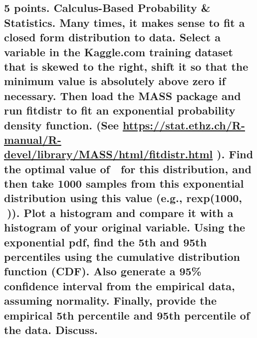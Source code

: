 \documentclass[]{article}
\begin{document}
\subsection{\texorpdfstring{5 points. Calculus-Based Probability \&
Statistics. Many times, it makes sense to fit a closed form distribution
to data. Select a variable in the Kaggle.com training dataset that is
skewed to the right, shift it so that the minimum value is absolutely
above zero if necessary. Then load the MASS package and run fitdistr to
fit an exponential probability density function. (See
\url{https://stat.ethz.ch/R-manual/R-devel/library/MASS/html/fitdistr.html}
). Find the optimal value of  for this distribution, and then take 1000
samples from this exponential distribution using this value (e.g.,
rexp(1000, )). Plot a histogram and compare it with a histogram of your
original variable. Using the exponential pdf, find the 5th and 95th
percentiles using the cumulative distribution function (CDF). Also
generate a 95\% confidence interval from the empirical data, assuming
normality. Finally, provide the empirical 5th percentile and 95th
percentile of the data.
Discuss.}{5 points. Calculus-Based Probability \& Statistics. Many times, it makes sense to fit a closed form distribution to data. Select a variable in the Kaggle.com training dataset that is skewed to the right, shift it so that the minimum value is absolutely above zero if necessary. Then load the MASS package and run fitdistr to fit an exponential probability density function. (See https://stat.ethz.ch/R-manual/R-devel/library/MASS/html/fitdistr.html ). Find the optimal value of  for this distribution, and then take 1000 samples from this exponential distribution using this value (e.g., rexp(1000, )). Plot a histogram and compare it with a histogram of your original variable. Using the exponential pdf, find the 5th and 95th percentiles using the cumulative distribution function (CDF). Also generate a 95\% confidence interval from the empirical data, assuming normality. Finally, provide the empirical 5th percentile and 95th percentile of the data. Discuss.}}\label{points.-calculus-based-probability-statistics.-many-times-it-makes-sense-to-fit-a-closed-form-distribution-to-data.-select-a-variable-in-the-kaggle.com-training-dataset-that-is-skewed-to-the-right-shift-it-so-that-the-minimum-value-is-absolutely-above-zero-if-necessary.-then-load-the-mass-package-and-run-fitdistr-to-fit-an-exponential-probability-density-function.-see-httpsstat.ethz.chr-manualr-devellibrarymasshtmlfitdistr.html-.-find-the-optimal-value-of-for-this-distribution-and-then-take-1000-samples-from-this-exponential-distribution-using-this-value-e.g.-rexp1000-.-plot-a-histogram-and-compare-it-with-a-histogram-of-your-original-variable.-using-the-exponential-pdf-find-the-5th-and-95th-percentiles-using-the-cumulative-distribution-function-cdf.-also-generate-a-95-confidence-interval-from-the-empirical-data-assuming-normality.-finally-provide-the-empirical-5th-percentile-and-95th-percentile-of-the-data.-discuss.}
\end{document}
